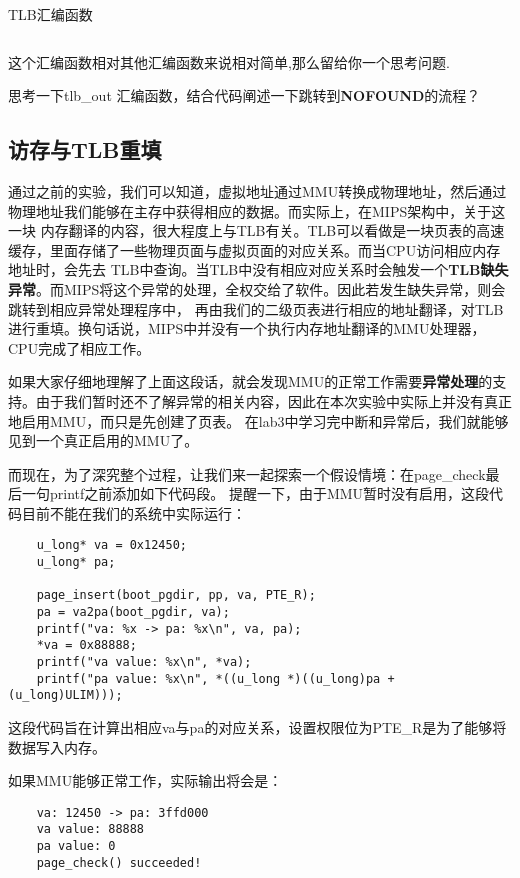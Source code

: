 \begin{codeBoxWithCaption}{TLB汇编函数\label{code:tlb_out.S}}
  \inputminted[linenos]{gas}{codes/tlb_out.S}
\end{codeBoxWithCaption}

这个汇编函数相对其他汇编函数来说相对简单,那么留给你一个思考问题.

\begin{thinking}\label{think-tlb}
思考一下tlb\_out 汇编函数，结合代码阐述一下跳转到\textbf{NOFOUND}的流程？
\end{thinking}
\subsection{访存与TLB重填}
  通过之前的实验，我们可以知道，虚拟地址通过MMU转换成物理地址，然后通过物理地址我们能够在主存中获得相应的数据。而实际上，在MIPS架构中，关于这一块
  内存翻译的内容，很大程度上与TLB有关。TLB可以看做是一块页表的高速缓存，里面存储了一些物理页面与虚拟页面的对应关系。而当CPU访问相应内存地址时，会先去
  TLB中查询。当TLB中没有相应对应关系时会触发一个\textbf{TLB缺失异常}。而MIPS将这个异常的处理，全权交给了软件。因此若发生缺失异常，则会跳转到相应异常处理程序中，
  再由我们的二级页表进行相应的地址翻译，对TLB进行重填。换句话说，MIPS中并没有一个执行内存地址翻译的MMU处理器，CPU完成了相应工作。

  如果大家仔细地理解了上面这段话，就会发现MMU的正常工作需要\textbf{异常处理}的支持。由于我们暂时还不了解异常的相关内容，因此在本次实验中实际上并没有真正地启用MMU，而只是先创建了页表。
  在lab3中学习完中断和异常后，我们就能够见到一个真正启用的MMU了。

  而现在，为了深究整个过程，让我们来一起探索一个假设情境：在page\_check最后一句printf之前添加如下代码段。
  提醒一下，由于MMU暂时没有启用，这段代码目前不能在我们的系统中实际运行：

  \begin{verbatim}
    u_long* va = 0x12450;
    u_long* pa;

    page_insert(boot_pgdir, pp, va, PTE_R);
    pa = va2pa(boot_pgdir, va);
    printf("va: %x -> pa: %x\n", va, pa);
    *va = 0x88888;
    printf("va value: %x\n", *va);
    printf("pa value: %x\n", *((u_long *)((u_long)pa + (u_long)ULIM)));
  \end{verbatim}

  这段代码旨在计算出相应va与pa的对应关系，设置权限位为PTE\_R是为了能够将数据写入内存。

  如果MMU能够正常工作，实际输出将会是：

  \begin{verbatim}
    va: 12450 -> pa: 3ffd000
    va value: 88888
    pa value: 0
    page_check() succeeded!
  \end{verbatim}

